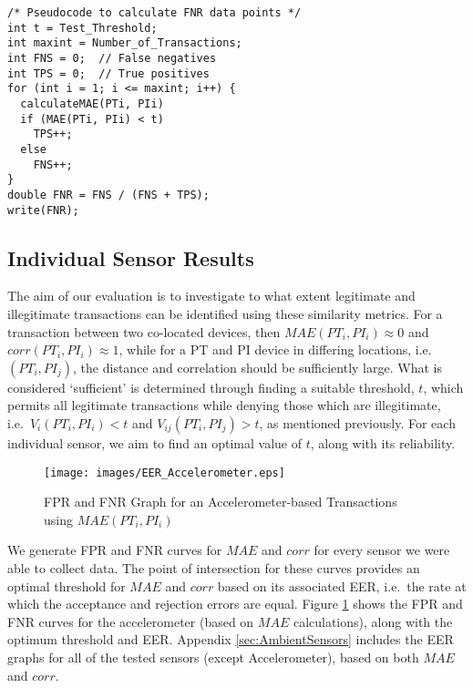 \documentclass{article}
\begin{document}
\begin{lstlisting}[style=customc, caption={Calculating False Negative Rate},label=CalculatingFNR]
/* Pseudocode to calculate FNR data points */
int t = Test_Threshold;
int maxint = Number_of_Transactions;
int FNS = 0;  // False negatives
int TPS = 0;  // True positives
for (int i = 1; i <= maxint; i++) {
  calculateMAE(PTi, PIi)
  if (MAE(PTi, PIi) < t)
    TPS++;
  else
    FNS++;
}
double FNR = FNS / (FNS + TPS);
write(FNR);
\end{lstlisting}

\subsection{Individual Sensor Results}
\label{sec:IndividualSensorResults}

The aim of our evaluation is to investigate to what extent legitimate and illegitimate transactions can be identified using these similarity metrics.  For a transaction between two co-located devices, then $MAE(PT_{i}, PI_{i}) \approx 0$ and $corr(PT_{i}, PI_{i}) \approx 1$, while for a PT and PI device in differing locations, i.e.\ $(PT_{i}, PI_{j})$, the distance and correlation should be sufficiently large.  What is considered `sufficient' is determined through finding a suitable threshold, $t$, which permits all legitimate transactions while denying those which are illegitimate, i.e.\ $V_i(PT_{i}, PI_{i}) < t$ and $V_{ij}(PT_{i}, PI_{j}) > t$, as mentioned previously.  For each individual sensor, we aim to find an optimal value of $t$, along with its reliability.

\begin{figure}[ht]
	\centering
		\texttt{[image: images/EER\_Accelerometer.eps]}
	\caption{FPR and FNR Graph for an Accelerometer-based Transactions using $MAE(PT_i,PI_i)$}
	\label{fig:EERAmbientSensor}
\end{figure}

We generate FPR and FNR curves for $MAE$ and $corr$ for every sensor we were able to collect data.  The point of intersection for these curves provides an optimal threshold for $MAE$ and $corr$ based on its associated EER, i.e.\ the rate at which the acceptance and rejection errors are equal. Figure \ref{fig:EERAmbientSensor} shows the FPR and FNR curves for the accelerometer (based on $MAE$ calculations), along with the optimum threshold and EER\@. Appendix \ref{sec:AmbientSensors} includes the EER graphs for all of the tested sensors (except Accelerometer), based on both $MAE$ and $corr$. 
\end{document}
